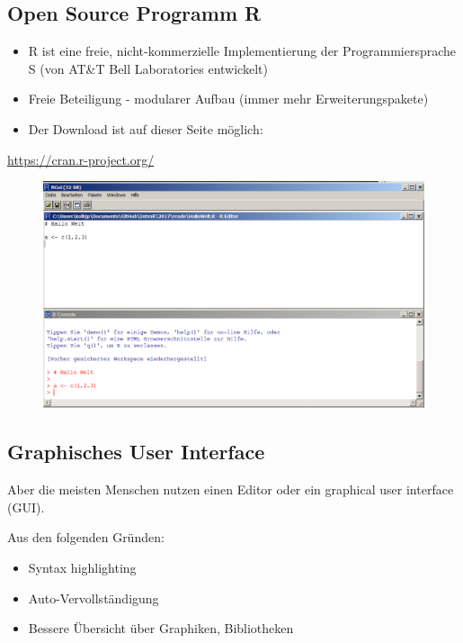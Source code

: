 \documentclass[]{article}
\providecommand{\tightlist}{%
  \setlength{\itemsep}{0pt}\setlength{\parskip}{0pt}}
\begin{document}
\subsection{Open Source Programm R}\label{open-source-programm-r}

\begin{itemize}
\item
  R ist eine freie, nicht-kommerzielle Implementierung der
  Programmiersprache S (von AT\&T Bell Laboratories entwickelt)
\item
  Freie Beteiligung - modularer Aufbau (immer mehr Erweiterungspakete)
\item
  Der Download ist auf dieser Seite möglich:
\end{itemize}

\url{https://cran.r-project.org/}

\begin{figure}[htbp]
\centering
\includegraphics{figure/BasisR.PNG}
\caption{}
\end{figure}

\subsection{Graphisches User
Interface}\label{graphisches-user-interface}

Aber die meisten Menschen nutzen einen Editor oder ein graphical user
interface (GUI).

Aus den folgenden Gründen:

\begin{itemize}
\tightlist
\item
  Syntax highlighting
\item
  Auto-Vervollständigung
\item
  Bessere Übersicht über Graphiken, Bibliotheken
\end{itemize}
\end{document}
